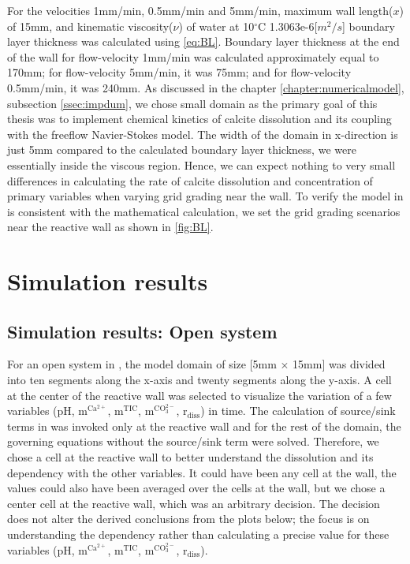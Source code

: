 For the velocities 1mm/min, 0.5mm/min and 5mm/min, maximum wall length($x$) of 15mm, and kinematic viscosity($\nu$) of 
water at 10$^\circ$C 1.3063e-6[$m^2/s$] \cite{wagner2008iapws} boundary layer thickness was calculated using \cref{eq:BL}. 
Boundary layer thickness at the end of the wall for flow-velocity 1mm/min was calculated approximately equal to 170mm; 
for flow-velocity 5mm/min, it was 75mm; and for flow-velocity 0.5mm/min, it was 240mm. As discussed in the chapter 
\ref{chapter:numericalmodel}, subsection \ref{ssec:impdum}, we chose small domain as the primary goal of this thesis was to 
implement chemical kinetics of calcite dissolution and its coupling with the freeflow Navier-Stokes model. 
The width of the domain in x-direction is just 5mm compared to the calculated boundary layer thickness, we were essentially 
inside the viscous region. Hence, we can expect nothing to very small differences in calculating the rate of calcite dissolution and concentration 
of primary variables when varying grid grading near the wall. To verify the model in \DuMuX is 
consistent with the mathematical calculation, we set the grid grading scenarios near the reactive wall as shown in \cref{fig:BL}. \\

\section{\DuMuX Simulation results}

\subsection{\DuMuX Simulation results: Open system}
For an open system in \DuMuX, the model domain of size [5mm $\times$ 15mm] was divided into ten segments along the x-axis and twenty segments along the y-axis.
A cell at the center of the reactive wall was selected to visualize the variation of a few variables (pH, $\mathrm{m^{Ca^{2+}}}$, $\mathrm{m^{TIC}}$, 
$\mathrm{m^{CO_3^{2-}}}$, $\mathrm{r_{diss}}$) in time. The calculation of source/sink terms in \DuMuX was invoked only at the reactive wall and for the rest of 
the domain, the governing equations without the source/sink term were solved. Therefore, we chose a cell at the reactive wall to better understand the dissolution
and its dependency with the other variables. It could have been any cell at the wall, the values could also have been averaged over the cells at the wall, but we 
chose a center cell at the reactive wall, which was an arbitrary decision. The decision does not alter the derived conclusions from the plots below; the focus is on 
understanding the dependency rather than calculating a precise value for these variables (pH, $\mathrm{m^{Ca^{2+}}}$, $\mathrm{m^{TIC}}$, 
$\mathrm{m^{CO_3^{2-}}}$, $\mathrm{r_{diss}}$).

